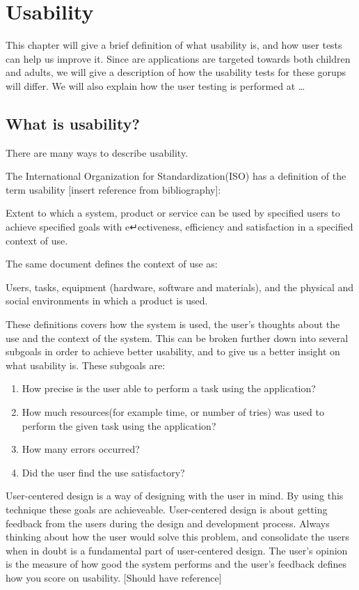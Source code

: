 \chapter{Usability}
\label{Usability}

This chapter will give a brief definition of what usability is, and how user tests can help us improve it. Since are applications are targeted towards both children and adults, we will give a description of how the usability tests for these gorups will differ. We will also explain how the user testing is performed at \ldots

\section{What is usability?}
There are many ways to describe usability. 

The International Organization for Standardization(ISO) has a definition of the term usability [insert reference from bibliography]: 

Extent to which a system, product or service can be used by specified
users to achieve specified goals with e↵ectiveness, efficiency
and satisfaction in a specified context of use.

The same document defines the context of use as:

Users, tasks, equipment (hardware, software and materials), and
the physical and social environments in which a product is used.

These definitions covers how the system is used, the user's thoughts about the use and the context of the system. This can be broken further down into several subgoals in order to achieve better usability, and to give us a better insight on what usability is. 
These subgoals are:

\begin{enumerate}
\item{How precise is the user able to perform a task using the application?}
\item{How much resources(for example time, or number of tries) was used to perform the given task using the application?}
\item{How many errors occurred?}
\item{Did the user find the use satisfactory?}
\end{enumerate}

User-centered design is a way of designing with the user in mind. By using this technique these goals are achieveable. User-centered design is about getting feedback from the users during the design and development process. Always thinking about how the user would solve this problem, and consolidate the users when in doubt is a fundamental part of user-centered design. The user's opinion is the measure of how good the system performs and the user's feedback defines how you score on usability. [Should have reference]

